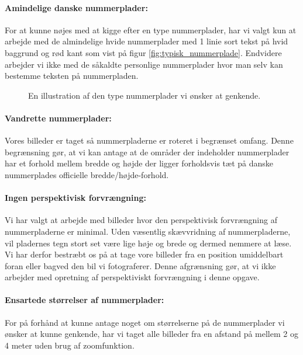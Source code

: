 \paragraph{Amindelige danske nummerplader:}
For at kunne nøjes med at kigge efter en type nummerplader, har vi valgt kun at arbejde med de almindelige hvide nummerplader med 1 linie sort tekst på hvid baggrund og rød kant som vist på figur \vref{fig:typisk_nummerplade}. Endvidere arbejder vi ikke med de såkaldte personlige nummerplader hvor man selv kan bestemme teksten på nummerpladen.

\begin{figure}[htp]
\centering
{} 
\caption{En illustration af den type nummerplader vi ønsker at genkende.}
\label{fig:typisk_nummerplade}
\end{figure}

\paragraph{Vandrette nummerplader:}
Vores billeder er taget så nummerpladerne er roteret i begrænset omfang. Denne begrænsning gør, at vi kan antage at de områder der indeholder nummerplader har et forhold mellem bredde og højde der ligger forholdsvis tæt på danske nummerplades officielle bredde/højde-forhold.

\paragraph{Ingen perspektivisk forvrængning:}
Vi har valgt at arbejde med billeder hvor den perspektivisk forvrængning af nummerpladerne er minimal. Uden væsentlig skævvridning af nummerpladerne, vil pladernes tegn stort set være lige høje og brede og dermed nemmere at læse. Vi har derfor bestræbt os på at tage vore billeder fra en position umiddelbart foran eller bagved den bil vi fotograferer. Denne afgrænsning gør, at vi ikke arbejder med opretning af perspektiviskt forvrængning i denne opgave. 

\paragraph{Ensartede størrelser af nummerplader:}
For på forhånd at kunne antage noget om størrelserne på de nummerplader vi ønsker at kunne genkende, har vi taget alle billeder fra en afstand på mellem 2 og 4 meter uden brug af zoomfunktion.

